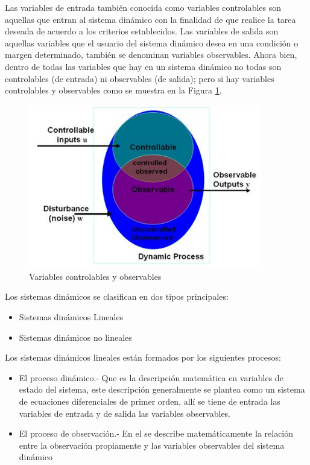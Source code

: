 \documentclass[12pt]{book}
\theoremstyle{definition}
\theoremstyle{remark}
\theoremstyle{plain}
\begin{document}
Las variables de entrada también conocida como variables controlables son aquellas que entran al sistema dinámico con la finalidad de que realice la tarea deseada de acuerdo a los criterios establecidos. Las variables de salida son aquellas variables que el usuario del sistema dinámico desea en una condición o margen determinado, también se denominan variables observables. Ahora bien, dentro de todas las variables que hay en un sistema dinámico no todas son controlables (de entrada) ni observables (de salida); pero si hay variables controlables y observables como se muestra en la Figura \ref{fig7}.

\begin{figure}
\centering
\includegraphics[width=4in]{observables.jpg}
\caption{Variables controlables y observables}
\label{fig7}
\end{figure}

Los sistemas dinámicos se clasifican en dos tipos principales:
\begin{itemize}
\item Sistemas dinámicos Lineales
\item Sistemas dinámicos no lineales
\end{itemize}

Los sistemas dinámicos lineales están formados por los siguientes procesos:
\begin{itemize}
\item El proceso dinámico.- Que es la descripción matemática en variables de estado del sistema, este descripción generalmente se plantea como un sistema de ecuaciones diferenciales de primer orden, allí se tiene de entrada las variables de entrada y de salida las variables observables.
\item El proceso de observación.- En el se describe matemáticamente la relación entre la observación propiamente y las variables observables del sistema dinámico
\end{itemize}
\end{document}
